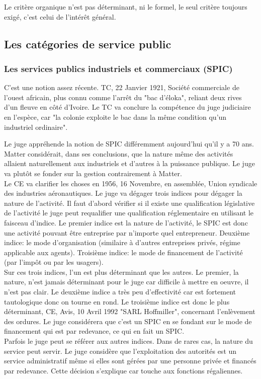 \documentclass[10pt, a4paper, openany]{book}
\begin{document}
Le critère organique n'est pas déterminant, ni le formel, le seul critère toujours exigé, c'est celui de l'intérêt général. 


\subsection{Les catégories de service public}

\subsubsection{Les services publics industriels et commerciaux (SPIC)}

C'est une notion assez récente. TC, 22 Janvier 1921, Société commerciale de l'ouest africain, plus connu comme l'arrêt du "bac d'éloka", reliant deux rives d'un fleuve en côté d'Ivoire. Le TC va conclure la compétence du juge judiciaire en l'espèce, car "la colonie exploite le bac dans la même condition qu'un industriel ordinaire". 


Le juge appréhende la notion de SPIC différemment aujourd'hui qu'il y a 70 ans. Matter considérait, dans ses conclusions, que la nature même des activités allaient naturellement aux industriels et d'autres à la puissance publique. Le juge va plutôt se fonder sur la gestion contrairement à Matter. \\
Le CE va clarifier les choses en 1956, 16 Novembre, en assemblée, Union syndicale des industries aéronautiques. Le juge va dégager trois indices pour dégager la nature de l'activité. Il faut d'abord vérifier si il existe une qualification législative de l'activité le juge peut requalifier une qualification réglementaire en utilisant le faisceau d'indice. Le premier indice est la nature de l'activité, le SPIC est donc une activité pouvant être entreprise par n'importe quel entrepreneur. Deuxième indice: le mode d'organisation (similaire à d'autres entreprises privés, régime applicable aux agents). Troisième indice: le mode de financement de l'activité (par l'impôt ou par les usagers). \\
Sur ces trois indices, l'un est plus déterminant que les autres. Le premier, la nature, n'est jamais déterminant pour le juge car difficile à mettre en oeuvre, il n'est pas clair. Le deuxième indice a très peu d'effectivité car est fortement tautologique donc on tourne en rond. Le troisième indice est donc le plus déterminant, CE, Avis, 10 Avril 1992 "SARL Hoffmiller", concernant l'enlèvement des ordures. Le juge considérera que c'est un SPIC en se fondant sur le mode de financement qui est par redevance, ce qui en fait un SPIC. \\
Parfois le juge peut se référer aux autres indices. Dans de rares cas, la nature du service peut servir. Le juge considère que l'exploitation des autorités est un service administratif même si elles sont gérées par une personne privée et financés par redevance. Cette décision s'explique car touche aux fonctions régaliennes. 
\end{document}
